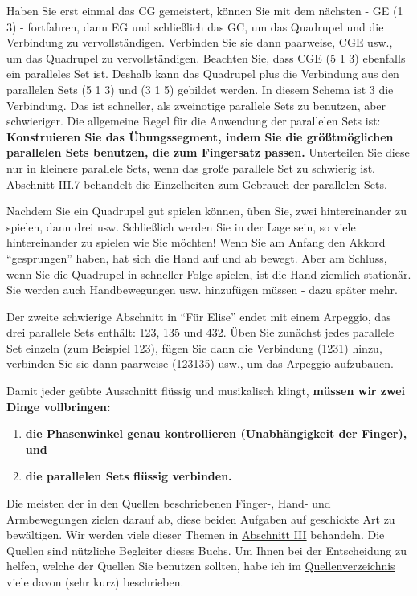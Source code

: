 Haben Sie erst einmal das CG gemeistert, können Sie mit dem nächsten - GE (1 3) - fortfahren, dann EG und schließlich das GC, um das Quadrupel und die Verbindung zu vervollständigen.
Verbinden Sie sie dann paarweise, CGE usw., um das Quadrupel zu vervollständigen.
Beachten Sie, dass CGE (5 1 3) ebenfalls ein paralleles Set ist.
Deshalb kann das Quadrupel plus die Verbindung aus den parallelen Sets (5 1 3) und (3 1 5) gebildet werden.
In diesem Schema ist 3 die Verbindung.
Das ist schneller, als zweinotige parallele Sets zu benutzen, aber schwieriger.
Die allgemeine Regel für die Anwendung der parallelen Sets ist: \textbf{Konstruieren Sie das Übungssegment, indem Sie die größtmöglichen parallelen Sets benutzen, die zum Fingersatz passen.}
Unterteilen Sie diese nur in kleinere parallele Sets, wenn das große parallele Set zu schwierig ist.
\hyperref[c1iii7]{Abschnitt III.7} behandelt die Einzelheiten zum Gebrauch der parallelen Sets.

Nachdem Sie ein Quadrupel gut spielen können, üben Sie, zwei hintereinander zu spielen, dann drei usw.
Schließlich werden Sie in der Lage sein, so viele hintereinander zu spielen wie Sie möchten!
Wenn Sie am Anfang den Akkord \enquote{gesprungen} haben, hat sich die Hand auf und ab bewegt.
Aber am Schluss, wenn Sie die Quadrupel in schneller Folge spielen, ist die Hand ziemlich stationär.
Sie werden auch Handbewegungen usw. hinzufügen müssen - dazu später mehr.

Der zweite schwierige Abschnitt in \enquote{Für Elise} endet mit einem Arpeggio, das drei parallele Sets enthält: 123, 135 und 432.
Üben Sie zunächst jedes parallele Set einzeln (zum Beispiel 123), fügen Sie dann die Verbindung (1231) hinzu, verbinden Sie sie dann paarweise (123135) usw., um das Arpeggio aufzubauen.

Damit jeder geübte Ausschnitt flüssig und musikalisch klingt, \textbf{müssen wir zwei Dinge vollbringen:}

\begin{enumerate}[label={\arabic*.}] 
\item \textbf{die Phasenwinkel genau kontrollieren (Unabhängigkeit der Finger), und}
\item \textbf{die parallelen Sets flüssig verbinden.}
 \end{enumerate}

Die meisten der in den Quellen beschriebenen Finger-, Hand- und Armbewegungen zielen darauf ab, diese beiden Aufgaben auf geschickte Art zu bewältigen.
Wir werden viele dieser Themen in \hyperref[c1iii1]{Abschnitt III} behandeln.
Die Quellen sind nützliche Begleiter dieses Buchs.
Um Ihnen bei der Entscheidung zu helfen, welche der Quellen Sie benutzen sollten, habe ich im \hyperref[reference]{Quellenverzeichnis} viele davon (sehr kurz) beschrieben.


